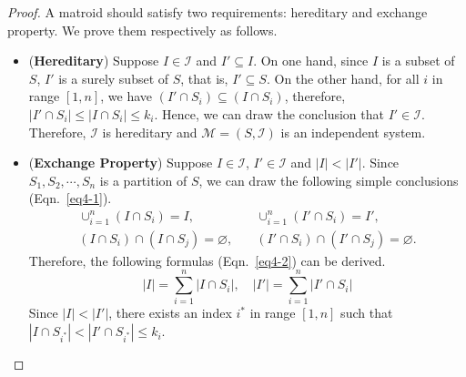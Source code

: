 \documentclass[12pt,a4paper]{article}
\theoremstyle{definition}
\begin{document}
\begin{enumerate}
   \begin{proof} A matroid should satisfy two requirements: hereditary and exchange property. We prove them respectively as follows.
       \begin{itemize}
       \item (\textbf{Hereditary}) Suppose $I \in \mathcal{I}$ and $I' \subseteq I$. On one hand, since $I$ is a subset of $S$, $I'$ is a surely subset of $S$, that is, $I' \subseteq S$. On the other hand, for all $i$ in range $[1,n]$, we have $(I' \cap S_i) \subseteq (I \cap S_i)$, therefore, $|I' \cap S_i| \leq |I \cap S_i| \leq k_i$. Hence, we can draw the conclusion that $I' \in \mathcal{I}$. Therefore, $\mathcal{I}$ is hereditary and $\mathcal{M}=(S,\mathcal{I})$ is an independent system.
       \item (\textbf{Exchange Property}) Suppose $I \in \mathcal{I}$, $I' \in \mathcal{I}$ and $|I| < |I'|$. Since $S_1, S_2,\cdots,S_n$ is a partition of $S$, we can draw the following simple conclusions (Eqn.~\eqref{eq4-1}).
           \begin{equation}
           \begin{aligned}
           \cup_{i=1}^n (I \cap S_i) = I,& \quad \cup_{i=1}^n (I' \cap S_i) = I',\\
           (I \cap S_i) \cap (I \cap S_j) = \varnothing,& \quad (I' \cap S_i) \cap (I' \cap S_j) = \varnothing.
           \end{aligned}
           \label{eq4-1}
           \end{equation}
           Therefore, the following formulas (Eqn.~\eqref{eq4-2}) can be derived.
           \begin{equation}
           |I| = \sum_{i=1}^n |I \cap S_i|,\quad |I'| = \sum_{i=1}^n |I' \cap S_i|
           \label{eq4-2}
           \end{equation}
           Since $|I| < |I'|$, there exists an index $i^*$ in range $[1,n]$ such that $|I \cap S_{i^*}| < |I' \cap S_{i^*}| \leq k_i$.


\end{itemize}
\end{proof}
\end{enumerate}
\end{document}
